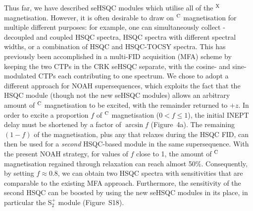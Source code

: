 \documentclass[final,twocolumn]{elsarticle}
\newcommand*{\noahSpb}{S$^+_2$}
\newcommand*{\carbon}{\ce{^{13}C}}
\newcommand*{\magn}[1]{\ce{^1H}$^{#1}$}
\begin{document}
Thus far, we have described seHSQC modules which utilise all of the \magn{\ce{X}} magnetisation.
However, it is often desirable to draw on \magn{\ce{C}} magnetisation for multiple different purposes: for example, one can simultaneously collect \carbon{}-decoupled and coupled HSQC spectra,\cite{Nolis2019CPC} HSQC spectra with different spectral widths,\cite{Nolis2019JMR} or a combination of HSQC and HSQC-TOCSY spectra.\cite{Nolis2019CPC}
This has previously been accomplished in a multi-FID acquisition (MFA) scheme by keeping the two CTPs in the CRK seHSQC separate, with the cosine- and sine-modulated CTPs each contributing to one spectrum.\cite{Nolis2019CPC, Nolis2019JMR}
We chose to adopt a different approach for NOAH supersequences, which exploits the fact that the HSQC module (though not the new seHSQC modules) allows an arbitrary amount of \magn{\ce{C}} magnetisation to be excited, with the remainder returned to $+z$.\cite{Kupce2007MRC, SchulzeSunninghausen2014JACS, SchulzeSunninghausen2017JMR, Koos2019JMR}
In order to excite a proportion $f$ of \magn{\ce{C}} magnetisation ($0 < f \leq 1$), the initial INEPT delay must be shortened by a factor of $\arcsin f$ (Figure~4a).
The remaining $(1 - f)$ of the magnetisation, plus any that relaxes during the HSQC FID, can then be used for a \textit{second} HSQC-based module in the same supersequence.
With the present NOAH strategy, for values of $f$ close to 1, the amount of \magn{\ce{C}} magnetisation regained through relaxation can reach almost 50\%.
Consequently, by setting $f \approx 0.8$, we can obtain two HSQC spectra with sensitivities that are comparable to the existing MFA approach.
Furthermore, the sensitivity of the second HSQC can be boosted by using the new seHSQC modules in its place, in particular the \noahSpb{} module (Figure~S18).
\end{document}
